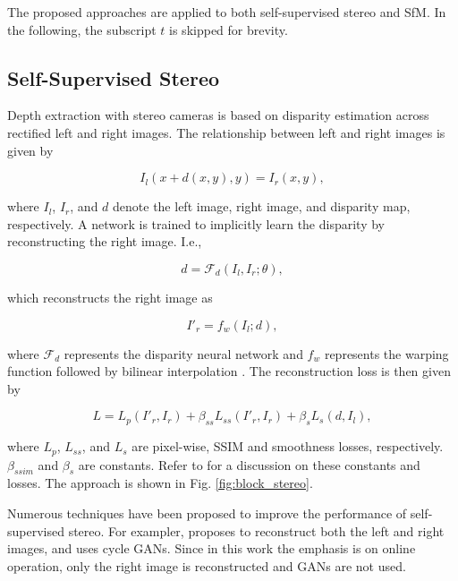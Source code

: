 \documentclass[lettersize,journal]{IEEEtran}
\begin{document}
 \noindent The proposed approaches are applied to both self-supervised stereo and SfM. 
 In the following, the subscript $t$ is skipped for brevity.
 
 \subsection{Self-Supervised Stereo}
 Depth extraction with stereo cameras is based on disparity estimation across rectified left and right images. The relationship between left and right images is given by 
 
 \begin{equation}
    I_l(x + d(x, y), y) = I_r(x, y),
 \end{equation}
 
 \noindent where $I_l$, $I_r$, and $d$ denote the left image, right image, and disparity map, respectively. A network is trained to implicitly learn the disparity by reconstructing the right image. I.e., 
 
 \begin{equation}
    d = \mathcal{F}_d(I_l, I_r; \theta),
 \end{equation}
 
 \noindent which reconstructs the right image as 
 
 \begin{equation}
    I'_r = f_w(I_l; d),
 \end{equation}
 
 \noindent where $\mathcal{F}_d$ represents the disparity neural network and $f_w$ represents the warping function followed by bilinear interpolation \cite{jaderberg2015spatial}. The reconstruction loss is then given by 
 
 \begin{equation}\label{eq:loss_st}
    L = L_{p}(I'_r, I_r) + \beta_{ss} L_{ss}(I'_r, I_r) + \beta_s L_{s}(d, I_l),
 \end{equation}
 
 \noindent where $L_{p}$, $L_{ss}$, and $L_{s}$ are pixel-wise, SSIM and smoothness losses, respectively. $\beta_{ssim}$ and $\beta_{s}$ are constants. Refer to \cite{godard2017unsupervised,godard2019digging} for a discussion on these constants and losses. The approach is shown in Fig. \ref{fig:block_stereo}.  
 
 Numerous techniques have been proposed to improve the performance of self-supervised stereo. For exampler, \cite{godard2017unsupervised} proposes to reconstruct both the left and right images, and \cite{pilzer2018unsupervised} uses cycle GANs. Since in this work the emphasis is on online operation, only the right image is reconstructed and GANs are not used.
 
\end{document}

